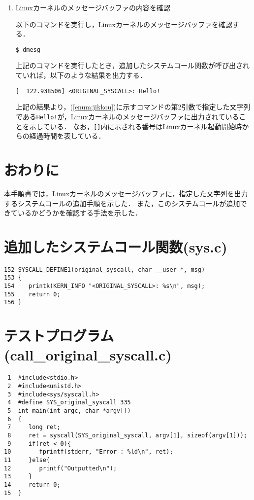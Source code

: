 \documentclass[12pt]{jsarticle}
\begin{document}
\begin{enumerate}
\item Linuxカーネルのメッセージバッファの内容を確認

  以下のコマンドを実行し，Linuxカーネルのメッセージバッファを確認する．
\begin{verbatim}
$ dmesg
\end{verbatim}
上記のコマンドを実行したとき，追加したシステムコール関数が呼び出されていれば，以下のような結果を出力する．
\begin{verbatim}
[  122.938506] <ORIGINAL_SYSCALL>: Hello!
\end{verbatim}
上記の結果より，(\ref{enum:jikkou})に示すコマンドの第2引数で指定した文字列である\verb|Hello!|が，Linuxカーネルのメッセージバッファに出力されていることを示している．
なお，\verb|[]|内に示される番号はLinuxカーネル起動開始時からの経過時間を表している．

\end{enumerate}

\section{おわりに}
本手順書では，Linuxカーネルのメッセージバッファに，指定した文字列を出力するシステムコールの追加手順を示した．
また，このシステムコールが追加できているかどうかを確認する手法を示した．

\appendix
\section{追加したシステムコール関数(sys.c)}\label{sec:optionA}

\begin{verbatim}
152	SYSCALL_DEFINE1(original_syscall, char __user *, msg)
153	{
154	   printk(KERN_INFO "<ORIGINAL_SYSCALL>: %s\n", msg);
155	   return 0;
156	}
\end{verbatim}

\section{テストプログラム(call\_original\_syscall.c)}\label{sec:optionB}

\begin{verbatim}
 1	#include<stdio.h>
 2	#include<unistd.h>
 3	#include<sys/syscall.h>
 4	#define SYS_original_syscall 335
 5	int main(int argc, char *argv[])
 6	{
 7	   long ret;
 8	   ret = syscall(SYS_original_syscall, argv[1], sizeof(argv[1]));
 9	   if(ret < 0){
10	      fprintf(stderr, "Error : %ld\n", ret);
11	   }else{
12	      printf("Outputted\n");
13	   }
14	   return 0;
15	}
\end{verbatim}


%
%
\end{document}

